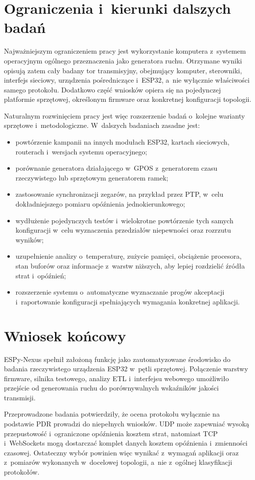 \section{Ograniczenia i~kierunki dalszych badań}

Najważniejszym ograniczeniem pracy jest wykorzystanie komputera z~systemem operacyjnym ogólnego przeznaczenia jako generatora ruchu.
Otrzymane wyniki opisują zatem cały badany tor transmisyjny, obejmujący komputer, sterowniki, interfejs sieciowy, urządzenia pośredniczące i~ESP32, a~nie wyłącznie właściwości samego protokołu.
Dodatkowo część wniosków opiera się na pojedynczej platformie sprzętowej, określonym firmware oraz konkretnej konfiguracji topologii.

Naturalnym rozwinięciem pracy jest więc rozszerzenie badań o~kolejne warianty sprzętowe i~metodologiczne.
W~dalszych badaniach zasadne jest:

\begin{itemize}
    \item powtórzenie kampanii na innych modułach ESP32, kartach sieciowych, routerach i~wersjach systemu operacyjnego;
    \item porównanie generatora działającego w~GPOS z~generatorem czasu rzeczywistego lub sprzętowym generatorem ramek;
    \item zastosowanie synchronizacji zegarów, na przykład przez PTP, w~celu dokładniejszego pomiaru opóźnienia jednokierunkowego;
    \item wydłużenie pojedynczych testów i~wielokrotne powtórzenie tych samych konfiguracji w~celu wyznaczenia przedziałów niepewności oraz rozrzutu wyników;
    \item uzupełnienie analizy o~temperaturę, zużycie pamięci, obciążenie procesora, stan buforów oraz informacje z~warstw niższych, aby lepiej rozdzielić źródła strat i~opóźnień;
    \item rozszerzenie systemu o~automatyczne wyznaczanie progów akceptacji i~raportowanie konfiguracji spełniających wymagania konkretnej aplikacji.
\end{itemize}

\section{Wniosek końcowy}

ESPy-Nexus spełnił założoną funkcję jako zautomatyzowane środowisko do badania rzeczywistego urządzenia ESP32 w~pętli sprzętowej.
Połączenie warstwy firmware, silnika testowego, analizy ETL i~interfejsu webowego umożliwiło przejście od generowania ruchu do porównywalnych wskaźników jakości transmisji.

Przeprowadzone badania potwierdziły, że ocena protokołu wyłącznie na podstawie PDR prowadzi do niepełnych wniosków.
UDP może zapewniać wysoką przepustowość i~ograniczone opóźnienia kosztem strat, natomiast TCP i~WebSockets mogą dostarczać komplet danych kosztem opóźnienia i~zmienności czasowej.
Ostateczny wybór powinien więc wynikać z~wymagań aplikacji oraz z~pomiarów wykonanych w~docelowej topologii, a~nie z~ogólnej klasyfikacji protokołów.
